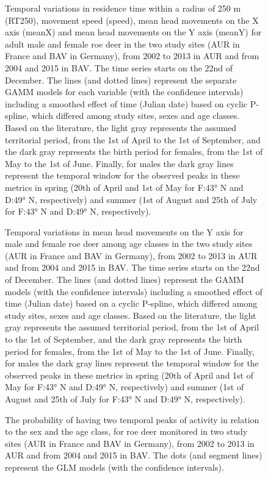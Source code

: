 \documentclass[a4paper,11pt]{article}
\begin{document}
\begin{figure} [!h]
\centering
\caption{Temporal variations in residence time within a radius of 250 m (RT250), movement speed (speed), mean head movements on the X axis (meanX) and mean head movements on the Y axis (meanY) for adult male and female roe deer in the two study sites (AUR in France and BAV in Germany), from 2002 to 2013 in AUR and from 2004 and 2015 in BAV. The time series starts on the 22nd of December. The lines (and dotted lines) represent the separate GAMM models for each variable (with the confidence intervals) including a smoothed effect of time (Julian date) based on cyclic P-spline, which differed among study sites, sexes and age classes. Based on the literature, the light gray represents the assumed territorial period, from the 1st of April to the 1st of September, and the dark gray represents the birth period for females, from the 1st of May to the 1st of June. Finally, for males the dark gray lines represent the temporal window for the observed peaks in these metrics in spring (20th of April and 1st of May for F:43° N and D:49° N, respectively) and summer (1st of August and 25th of July for F:43° N and D:49° N, respectively).}
\end{figure}

\begin{figure} [!h]
\centering
\caption{Temporal variations in mean head movements on the Y axis for male and female roe deer among age classes in the two study sites (AUR in France and BAV in Germany), from 2002 to 2013 in AUR and from 2004 and 2015 in BAV. The time series starts on the 22nd of December. The lines (and dotted lines) represent the GAMM models (with the confidence intervals) including a smoothed effect of time (Julian date) based on a cyclic P-spline, which differed among study sites, sexes and age classes. Based on the literature, the light gray represents the assumed territorial period, from the 1st of April to the 1st of September, and the dark gray represents the birth period for females, from the 1st of May to the 1st of June. Finally, for males the dark gray lines represent the temporal window for the observed peaks in these metrics in spring (20th of April and 1st of May for F:43° N and D:49° N, respectively) and summer (1st of August and 25th of July for F:43° N and D:49° N, respectively).}
\end{figure}

\begin{figure} [!h]
\centering
\caption{The probability of having two temporal peaks of activity in relation to the sex and the age class, for roe deer monitored in two study sites (AUR in France and BAV in Germany), from 2002 to 2013 in AUR and from 2004 and 2015 in BAV. The dots (and segment lines) represent the GLM models (with the confidence intervals).}
\end{figure}
\end{document}

